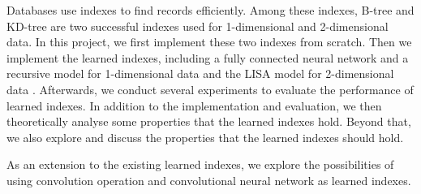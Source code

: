 Databases use indexes to find records efficiently. Among these indexes, B-tree and KD-tree are two successful indexes used for 1-dimensional and 2-dimensional data. In this project, we first implement these two indexes from scratch. Then we implement the learned indexes, including a fully connected neural network and a recursive model for 1-dimensional data \cite{kraska2018case} and the LISA model for 2-dimensional data \cite{li2020lisa}. Afterwards, we conduct several experiments to evaluate the performance of learned indexes. In addition to the implementation and evaluation, we then theoretically analyse some properties that the learned indexes hold. Beyond that, we also explore and discuss the properties that the learned indexes should hold.

As an extension to the existing learned indexes, we explore the possibilities of using convolution operation and convolutional neural network as learned indexes.